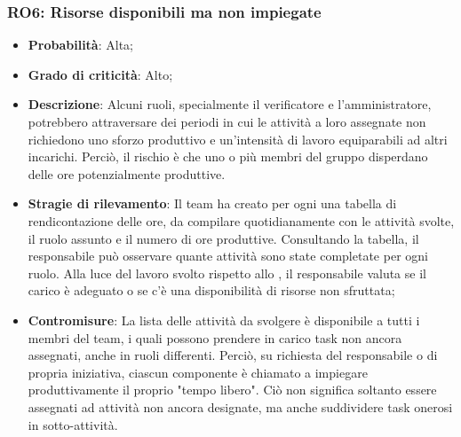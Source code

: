 \subsubsection{RO6: Risorse disponibili ma non impiegate}
\begin{itemize}
    \item \textbf{Probabilità}: Alta;
    \item \textbf{Grado di criticità}: Alto;
    \item \textbf{Descrizione}: Alcuni ruoli, specialmente il verificatore e l'amministratore, potrebbero attraversare dei periodi in cui le attività a loro assegnate non richiedono uno sforzo produttivo e un'intensità di lavoro equiparabili ad altri incarichi. Perciò, il rischio è che uno o più membri del gruppo disperdano delle ore potenzialmente produttive.
    \item \textbf{Stragie di rilevamento}: Il team ha creato per ogni  una tabella di rendicontazione delle ore, da compilare quotidianamente con le attività svolte, il ruolo assunto e il numero di ore produttive. Consultando la tabella, il responsabile può osservare quante attività sono state completate per ogni ruolo. Alla luce del lavoro svolto rispetto allo , il responsabile valuta se il carico è adeguato o se c'è una disponibilità di risorse non sfruttata;
    \item \textbf{Contromisure}: La lista delle attività da svolgere è disponibile a tutti i membri del team, i quali possono prendere in carico task non ancora assegnati, anche in ruoli differenti. Perciò, su richiesta del responsabile o di propria iniziativa, ciascun componente è chiamato a impiegare produttivamente il proprio "tempo libero". Ciò non significa soltanto essere assegnati ad attività non ancora designate, ma anche suddividere task onerosi in sotto-attività. 
\end{itemize}
